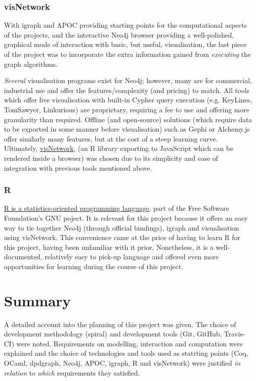 \subsubsection{visNetwork}

With igraph and APOC providing starting points for the computational aspects of
the projects, and the interactive Neo4j browser providing a well-polished,
graphical mode of interaction with basic, but useful, visualisation, the last
piece of the project was to incorporate the extra information gained from
\emph{executing} the graph algorithms.

\emph{Several} visualisation programs exist for Neo4j; however, many are for
commercial, industrial use and offer the features/complexity (and pricing) to
match. All tools which offer live visualisation with built-in Cypher query
execution (e.g. KeyLines, TomSawyer, Linkurious) are proprietary, requiring a
fee to use and offering more granularity than required. Offline (and
open-source) solutions (which require data to be exported in some manner before
visualisation) such as Gephi or Alchemy.js offer similarly many features, but at
the cost of a steep learning curve.  Ultimately,
\href{http://datastorm-open.github.io/visNetwork}{visNetwork}, (an R library
exporting to JavaScript which can be rendered inside a browser) was chosen due
to its simplicity and ease of integration with previous tools mentioned above.

\subsubsection{R}

\href{http://www.r-project.org}{R is a statistics-oriented programming language},
part of the Free Software Foundation's GNU poject. It is relevant for this
project because it offers an easy way to tie together Neo4j (through official
bindings), igraph and visualisation using visNetwork. This convenience came at
the price of having to learn R for this project, having been unfamiliar with it
prior. Nonetheless, it is a well-documented, relatively easy to pick-up language
and offered even more opportunities for learning during the course of this
project.

\section{Summary}

A detailed account into the planning of this project was given. The choice of
development methodology (spiral) and development tools (Git, GitHub, Travis-CI)
were noted. Requirements on modelling, interaction and computation were
explained and the choice of technologies and tools used as statrting points
(Coq, OCaml, dpdgraph, Neo4j, APOC, igraph, R and visNetwork) were justified
\emph{in relation} to \emph{which} requirements they satisfied.
